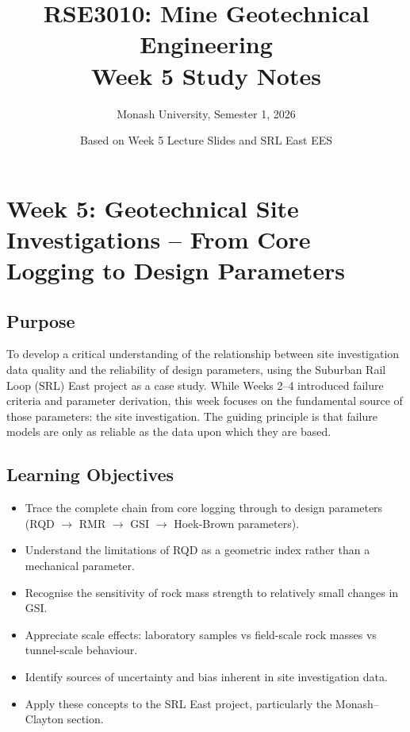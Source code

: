 \documentclass[a4paper,12pt]{article}
\title{\textbf{RSE3010: Mine Geotechnical Engineering} \\ Week 5 Study Notes}
\author{Monash University, Semester 1, 2026}
\date{Based on Week 5 Lecture Slides and SRL East EES}
\begin{document}
\maketitle

\section{Week 5: Geotechnical Site Investigations -- From Core Logging to Design Parameters}

\subsection{Purpose}
To develop a critical understanding of the relationship between site investigation data quality and the reliability of design parameters, using the Suburban Rail Loop (SRL) East project as a case study. While Weeks 2--4 introduced failure criteria and parameter derivation, this week focuses on the fundamental source of those parameters: the site investigation. The guiding principle is that failure models are only as reliable as the data upon which they are based.

\subsection{Learning Objectives}
\begin{itemize}
    \item Trace the complete chain from core logging through to design parameters (RQD $\rightarrow$ RMR $\rightarrow$ GSI $\rightarrow$ Hoek-Brown parameters).
    \item Understand the limitations of RQD as a geometric index rather than a mechanical parameter.
    \item Recognise the sensitivity of rock mass strength to relatively small changes in GSI.
    \item Appreciate scale effects: laboratory samples vs field-scale rock masses vs tunnel-scale behaviour.
    \item Identify sources of uncertainty and bias inherent in site investigation data.
    \item Apply these concepts to the SRL East project, particularly the Monash--Clayton section.
\end{itemize}
\end{document}
